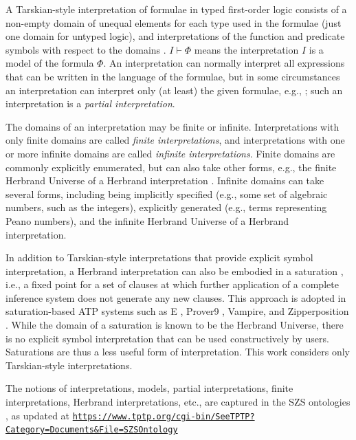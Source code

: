 \documentclass{easychair}
\newcommand{\smalltt}[1]{\small \texttt{#1}}
\begin{document}
A Tarskian-style interpretation \cite{TV56} of formulae in typed first-order logic consists of a 
non-empty domain of unequal elements for each type used in the formulae (just one domain for 
untyped logic), and interpretations of the function and predicate symbols with respect to the 
domains \cite{Hun96,Gal15}.
$I \vdash \Phi$ means the interpretation $I$ is a model of the formula $\Phi$.
An interpretation can normally interpret all expressions that can be written in the language of 
the formulae, but in some circumstances an interpretation can interpret only (at least) the given 
formulae, e.g., \cite{BSW23}; such an interpretation is a {\em partial interpretation}.

The domains of an interpretation may be finite or infinite.
Interpretations with only finite domains are called {\em finite interpretations}, and
interpretations with one or more infinite domains are called {\em infinite interpretations}.
Finite domains are commonly explicitly enumerated, but can also take other forms, e.g., the 
finite Herbrand Universe of a Herbrand interpretation \cite{Her30}.
Infinite domains can take several forms, including being implicitly specified (e.g., some set
of algebraic numbers, such as the integers), explicitly generated (e.g., terms representing 
Peano numbers), and the infinite Herbrand Universe of a Herbrand interpretation.

In addition to Tarskian-style interpretations that provide explicit symbol interpretation, 
a Herbrand interpretation can also be embodied in a saturation \cite{BG+01},
i.e., a fixed point for a set of clauses at which further application of a complete inference 
system does not generate any new clauses.
This approach is adopted in saturation-based ATP systems such as E \cite{SCV19},
Prover9 \cite{McC-Prover9-URL}, Vampire, and Zipperposition \cite{VB+21}.
While the domain of a saturation is known to be the Herbrand Universe, there is no explicit
symbol interpretation that can be used constructively by users.
Saturations are thus a less useful form of interpretation.
This work considers only Tarskian-style interpretations.

The notions of interpretations, models, partial interpretations, finite interpretations,
Herbrand interpretations, etc., are captured in the SZS ontologies \cite{Sut08-KEAPPA}, as
updated at 
{\smalltt{\url{https://www.tptp.org/cgi-bin/SeeTPTP?Category=Documents&File=SZSOntology}}}

\end{document}
